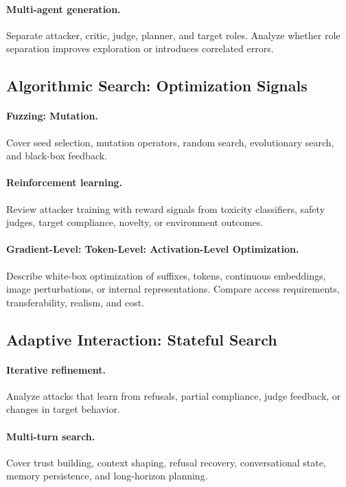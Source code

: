 \paragraph{Multi-agent generation.}
Separate attacker, critic, judge, planner, and target roles. Analyze whether role separation improves exploration or introduces correlated errors.

\subsection{Algorithmic Search: Optimization Signals}

\paragraph{Fuzzing: Mutation.}
Cover seed selection, mutation operators, random search, evolutionary search, and black-box feedback.

\paragraph{Reinforcement learning.}
Review attacker training with reward signals from toxicity classifiers, safety judges, target compliance, novelty, or environment outcomes.

\paragraph{Gradient-Level: Token-Level: Activation-Level Optimization.}
Describe white-box optimization of suffixes, tokens, continuous embeddings, image perturbations, or internal representations. Compare access requirements, transferability, realism, and cost.

\subsection{Adaptive Interaction: Stateful Search}

\paragraph{Iterative refinement.}
Analyze attacks that learn from refusals, partial compliance, judge feedback, or changes in target behavior.

\paragraph{Multi-turn search.}
Cover trust building, context shaping, refusal recovery, conversational state, memory persistence, and long-horizon planning.

